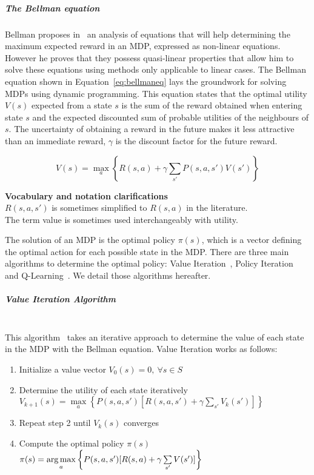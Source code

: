 \subparagraph{The Bellman equation}
Bellman proposes in~\cite{bellman1957} an analysis of equations that will help determining the maximum expected reward in an MDP, expressed as non-linear equations. However he proves that they possess quasi-linear properties that allow him to solve these equations using methods only applicable to linear cases. 
The Bellman equation shown in Equation~\eqref{eq:bellmaneq} lays the groundwork for solving MDPs using dynamic programming.
This equation states that the optimal utility $V(s)$ expected from a state $s$ is the sum of the reward obtained when entering state $s$ and the expected discounted sum of probable utilities of the neighbours of $s$. The uncertainty of obtaining a reward in the future makes it less attractive than an immediate reward, $\gamma$ is the discount factor for the future reward.

\begin{equation}
V(s) = \max\limits_a \left \{R(s,a) + \gamma   \sum\limits_{s'} P(s,a,s')V(s') \right \}
\label{eq:bellmaneq}
\end{equation}



\textbf{Vocabulary and notation clarifications}\\
$R(s,a,s')$ is sometimes simplified to $R(s,a)$ in the literature.\\
The term value is sometimes used interchangeably with utility.




The solution of an MDP is the optimal policy $\pi(s)$, which is a vector defining the optimal action for each possible state in the MDP.
There are three main algorithms to determine the optimal policy: Value Iteration~\cite{bellman1957}, Policy Iteration~\cite{policyiteration} and Q-Learning~\cite{qlearning}.
We detail those algorithms hereafter.


\subparagraph{Value Iteration Algorithm}\textbf{\\}
This algorithm~\cite{bellman1957} takes an iterative approach to determine the value of each state in the MDP with the Bellman equation.
Value Iteration works as follows:
\begin{enumerate}
    \item Initialize a value vector $V_0(s)=0,~\forall s\in S$
    \item Determine the utility of each state iteratively\\{$V_{k+1}(s) = \max\limits_a \left \{ P(s,a,s')[R(s,a,s') + \gamma \sum\limits_{s'}V_k(s')] \right \}$}
    \item Repeat step 2 until $V_{k}(s)$ converges
    \item Compute the optimal policy $\pi(s)$\\$\pi(s) = \operatorname*{arg\,max}\limits_a \left \{P(s,a,s')[R(s,a) + \gamma \sum\limits_{s'}V(s')] \right \}$
\end{enumerate}

